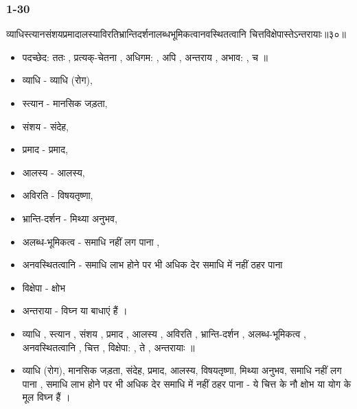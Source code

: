 \begin{frame}[fragile]\frametitle{1-30}
\begin{sanskrit}
व्याधिस्त्यानसंशयप्रमादालस्याविरतिभ्रान्तिदर्शनालब्धभूमिकत्वानवस्थितत्वानि चित्तविक्षेपास्तेऽन्तरायाः॥३०॥
\end{sanskrit}

	\begin{itemize}
	\item पदच्छेद: ततः , प्रत्यक्-चेतना , अधिगम: , अपि , अन्तराय , अभाव: , च ॥
	\item व्याधि - व्याधि (रोग),
	\item स्त्यान - मानसिक जड़ता,
	\item संशय - संदेह,
	\item प्रमाद - प्रमाद,
	\item आलस्य - आलस्य,
	\item अविरति - विषयतृष्णा,
	\item भ्रान्ति-दर्शन - मिथ्या अनुभव,
	\item अलब्ध-भूमिकत्व - समाधि नहीं लग पाना ,
	\item अनवस्थितत्वानि - समाधि लाभ होने पर भी अधिक देर समाधि में नहीं ठहर पाना
	\item विक्षेपा - क्षोभ
	\item अन्तराया - विघ्न या बाधाएं हैं ।
	\item व्याधि , स्त्यान , संशय , प्रमाद , आलस्य , अविरति , भ्रान्ति-दर्शन , अलब्ध-भूमिकत्व , अनवस्थितत्वानि , चित्त , विक्षेपा: , ते , अन्तरायाः ॥
	\item व्याधि (रोग), मानसिक जड़ता, संदेह, प्रमाद, आलस्य, विषयतृष्णा, मिथ्या अनुभव, समाधि नहीं लग पाना , समाधि लाभ होने पर भी अधिक देर समाधि में नहीं ठहर पाना - ये चित्त के नौ क्षोभ या योग के मूल विघ्न हैं ।		
	\end{itemize}
\end{frame}


